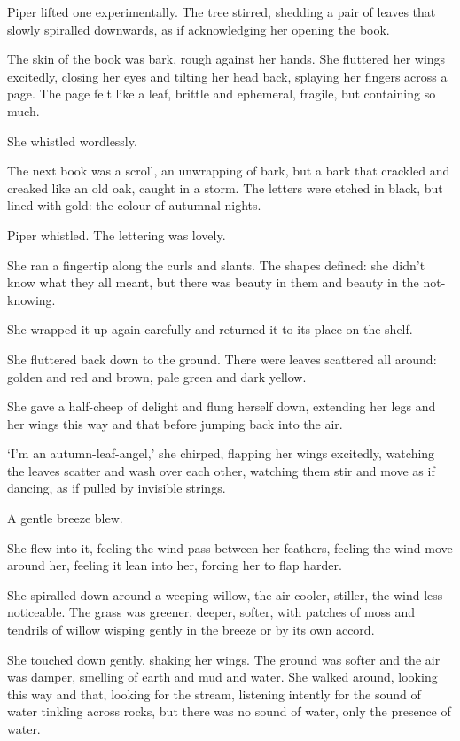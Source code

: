 Piper lifted one experimentally. The tree stirred, shedding a pair of
leaves that slowly spiralled downwards, as if acknowledging her
opening the book.

The skin of the book was bark, rough against her hands. She fluttered
her wings excitedly, closing her eyes and tilting her head back,
splaying her fingers across a page. The page felt like a leaf, brittle
and ephemeral, fragile, but containing so much.

She whistled wordlessly.

The next book was a scroll, an unwrapping of bark, but a bark that
crackled and creaked like an old oak, caught in a storm. The letters
were etched in black, but lined with gold: the colour of autumnal
nights.

Piper whistled. The lettering was lovely.

She ran a fingertip along the curls and slants. The shapes defined:
she didn't know what they all meant, but there was beauty in them and
beauty in the not-knowing.

She wrapped it up again carefully and returned it to its place on the shelf.

She fluttered back down to the ground. There were leaves scattered all
around: golden and red and brown, pale green and dark yellow.

She gave a half-cheep of delight and flung herself down, extending her
legs and her wings this way and that before jumping back into the air.

`I'm an autumn-leaf-angel,' she chirped, flapping her wings excitedly,
watching the leaves scatter and wash over each other, watching them
stir and move as if dancing, as if pulled by invisible strings.

A gentle breeze blew.

She flew into it, feeling the wind pass between her feathers, feeling
the wind move around her, feeling it lean into her, forcing her to
flap harder.

She spiralled down around a weeping willow, the air cooler, stiller,
the wind less noticeable. The grass was greener, deeper, softer, with
patches of moss and tendrils of willow wisping gently in the breeze or
by its own accord.

She touched down gently, shaking her wings. The ground was softer and
the air was damper, smelling of earth and mud and water. She walked
around, looking this way and that, looking for the stream, listening
intently for the sound of water tinkling across rocks, but there was
no sound of water, only the presence of water. %

